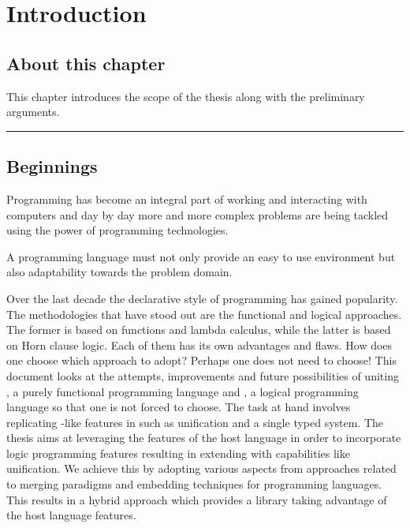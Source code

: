 \documentclass[thesis-solanki.tex]{subfiles}
\begin{document}
\chapter{Introduction}\label{chap:introduction}


\section{About this chapter}

This chapter introduces the scope of the thesis along with the preliminary arguments.


\noindent\rule{\textwidth}{0.5pt}


\section{Beginnings}

Programming has become an integral part of working and interacting with computers and day by day more and more
complex problems are being tackled using the power of programming technologies.

A programming language must not only provide an easy to use environment but also adaptability towards the problem
domain. 

Over the last decade the declarative style of programming has gained popularity.
The methodologies that have stood out are the functional and logical approaches.
The former is based on functions and lambda calculus, while the latter is based on Horn clause logic.
Each of them has its own advantages and flaws.
How does one choose which approach to adopt?
Perhaps one does not need to choose!
This document looks at the attempts, improvements and future possibilities of uniting , a purely
functional programming language and , a logical programming language so that one is not forced to
choose.
The task at hand involves replicating -like features in  such as unification and
a single typed system.
The thesis aims at leveraging the features of the host language in order to incorporate logic programming features
resulting in extending  with capabilities like unification.
We achieve this by adopting various aspects from approaches related to merging paradigms and embedding techniques
for programming languages.
This results in a hybrid approach which provides a library taking advantage of the host language features.
\end{document}
